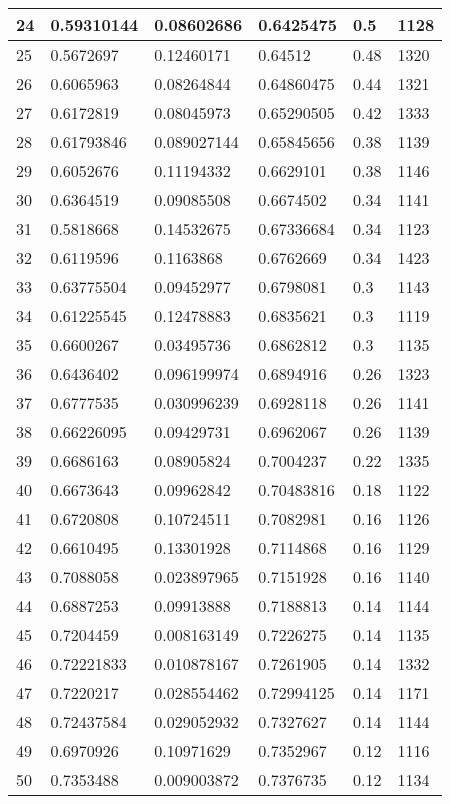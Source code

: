 \begin{longtable}{|l|l|l|l|l|l|}
24 & 0.59310144 & 0.08602686 & 0.6425475 & 0.5 & 1128 \\ \hline 
25 & 0.5672697 & 0.12460171 & 0.64512 & 0.48 & 1320 \\ \hline 
26 & 0.6065963 & 0.08264844 & 0.64860475 & 0.44 & 1321 \\ \hline 
27 & 0.6172819 & 0.08045973 & 0.65290505 & 0.42 & 1333 \\ \hline 
28 & 0.61793846 & 0.089027144 & 0.65845656 & 0.38 & 1139 \\ \hline 
29 & 0.6052676 & 0.11194332 & 0.6629101 & 0.38 & 1146 \\ \hline 
30 & 0.6364519 & 0.09085508 & 0.6674502 & 0.34 & 1141 \\ \hline 
31 & 0.5818668 & 0.14532675 & 0.67336684 & 0.34 & 1123 \\ \hline 
32 & 0.6119596 & 0.1163868 & 0.6762669 & 0.34 & 1423 \\ \hline 
33 & 0.63775504 & 0.09452977 & 0.6798081 & 0.3 & 1143 \\ \hline 
34 & 0.61225545 & 0.12478883 & 0.6835621 & 0.3 & 1119 \\ \hline 
35 & 0.6600267 & 0.03495736 & 0.6862812 & 0.3 & 1135 \\ \hline 
36 & 0.6436402 & 0.096199974 & 0.6894916 & 0.26 & 1323 \\ \hline 
37 & 0.6777535 & 0.030996239 & 0.6928118 & 0.26 & 1141 \\ \hline 
38 & 0.66226095 & 0.09429731 & 0.6962067 & 0.26 & 1139 \\ \hline 
39 & 0.6686163 & 0.08905824 & 0.7004237 & 0.22 & 1335 \\ \hline 
40 & 0.6673643 & 0.09962842 & 0.70483816 & 0.18 & 1122 \\ \hline 
41 & 0.6720808 & 0.10724511 & 0.7082981 & 0.16 & 1126 \\ \hline 
42 & 0.6610495 & 0.13301928 & 0.7114868 & 0.16 & 1129 \\ \hline 
43 & 0.7088058 & 0.023897965 & 0.7151928 & 0.16 & 1140 \\ \hline 
44 & 0.6887253 & 0.09913888 & 0.7188813 & 0.14 & 1144 \\ \hline 
45 & 0.7204459 & 0.008163149 & 0.7226275 & 0.14 & 1135 \\ \hline 
46 & 0.72221833 & 0.010878167 & 0.7261905 & 0.14 & 1332 \\ \hline 
47 & 0.7220217 & 0.028554462 & 0.72994125 & 0.14 & 1171 \\ \hline 
48 & 0.72437584 & 0.029052932 & 0.7327627 & 0.14 & 1144 \\ \hline 
49 & 0.6970926 & 0.10971629 & 0.7352967 & 0.12 & 1116 \\ \hline 
50 & 0.7353488 & 0.009003872 & 0.7376735 & 0.12 & 1134 \\ \hline 
\end{longtable}